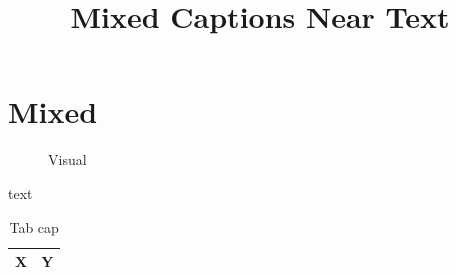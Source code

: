 \documentclass{article}
\begin{document}
\title{Mixed Captions Near Text}\maketitle
\section{Mixed}\begin{figure}[h]\centering{}\caption{Visual}\label{fig:mixed}\end{figure} text \begin{table}[h]\centering\caption{Tab cap}\label{tab:mixed}\begin{tabular}{|l|l|}\hline X&Y\\\hline\end{tabular}\end{table}
\end{document}
